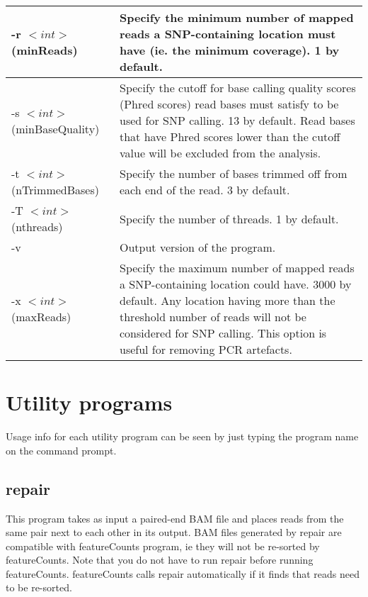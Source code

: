 \documentclass[12pt]{report}
\newcommand{\featureCounts}{\textsf{featureCounts}}
\newcommand{\repair}{\textsf{repair}}
\begin{document}
\begin{longtable}{|p{4.5cm}|p{11cm}|}
\hline
-r $<int>$ \newline (minReads) & Specify the minimum number of mapped reads a SNP-containing location must have (ie. the minimum coverage). 1 by default. \\
\hline
-s $<int>$ \newline (minBaseQuality) & Specify the cutoff for base calling quality scores (Phred scores) read bases must satisfy to be used for SNP calling. 13 by default. Read bases that have Phred scores lower than the cutoff value will be excluded from the analysis. \\
\hline
-t $<int>$ \newline (nTrimmedBases) & Specify the number of bases trimmed off from each end of the read. 3 by default. \\
\hline
-T $<int>$ \newline (nthreads) & Specify the number of threads. 1 by default. \\
\hline
-v & Output version of the program. \\
\hline
-x $<int>$ \newline (maxReads) & Specify the maximum number of mapped reads a SNP-containing location could have. 3000 by default. Any location having more than the threshold number of reads will not be considered for SNP calling. This option is useful for removing PCR artefacts. \\
\hline
\end{longtable}



\chapter{Utility programs}

Usage info for each utility program can be seen by just typing the program name on the command prompt.

\section{repair}

This program takes as input a paired-end BAM file and places reads from the same pair next to each other in its output.
BAM files generated by {\repair} are compatible with {\featureCounts} program, ie they will not be re-sorted by {\featureCounts}.
Note that you do not have to run {\repair} before running {\featureCounts}.
{\featureCounts} calls {\repair} automatically if it finds that reads need to be re-sorted.
\end{document}
